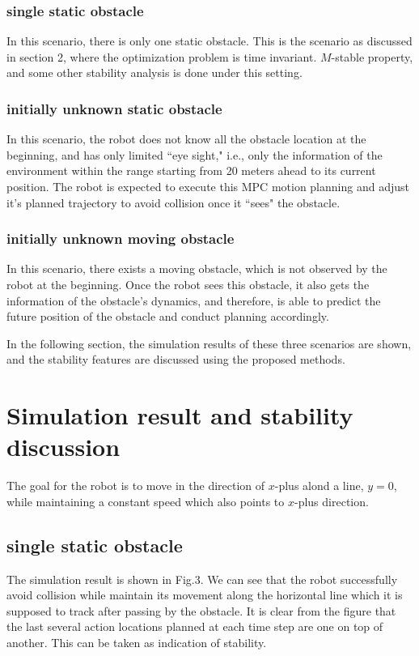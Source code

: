 \documentclass{ifacconf}
\begin{document}
\subsubsection{single static obstacle}
In this scenario, there is  only one static obstacle. This is the scenario as discussed in section 2, where the optimization problem is time invariant. $M$-stable property, and some other stability analysis is done under this setting.

\subsubsection{initially unknown static obstacle}
In this scenario, the robot does not know all the obstacle location at the beginning, and has only limited ``eye sight," i.e., only the information of the environment within the range starting from 20 meters ahead to its current position. The robot is expected to execute this MPC motion planning and adjust it's planned trajectory to avoid collision once it ``sees" the obstacle.

\subsubsection{initially unknown moving obstacle}
In this scenario, there exists a moving obstacle, which is not observed by the robot at the beginning. Once the robot sees this obstacle, it also gets the information of the obstacle's dynamics, and therefore, is able to predict the future position of the obstacle and conduct planning accordingly. 

In the following section, the simulation results of these three scenarios are shown, and the stability features are discussed using the proposed methods.



\section{Simulation result and stability discussion}

The goal for the robot is to move in the direction of $x$-plus alond a line, $y=0$, while maintaining a constant speed which also points to $x$-plus direction. 
\subsection{single static obstacle}
The simulation result is shown in Fig.3. We can see that the robot successfully avoid collision while maintain its movement along the horizontal line which it is supposed to track after passing by the obstacle. It is clear from the figure that the last several action locations planned at each time step are one on top of another. This can be taken as indication of stability. 
\end{document}
